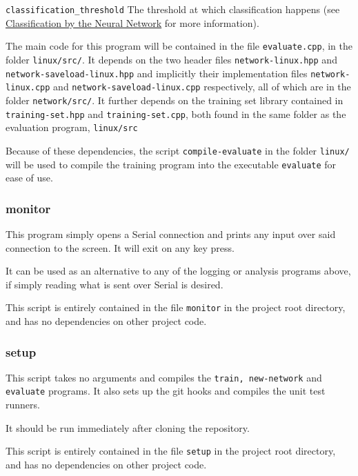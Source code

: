 \documentclass[a4paper]{article}
\begin{document}
\lstinline{classification_threshold} The threshold at which classification happens (see \hyperref[subsec:dc_classification]{Classification by the Neural Network} for more information).

The main code for this program will be contained in the file \lstinline{evaluate.cpp}, in the folder \lstinline{linux/src/}. It depends on the two header files \lstinline{network-linux.hpp} and \lstinline{network-saveload-linux.hpp} and implicitly their implementation files \lstinline{network-linux.cpp} and \lstinline{network-saveload-linux.cpp} respectively, all of which are in the folder \lstinline{network/src/}. It further depends on the training set library contained in \lstinline{training-set.hpp} and \lstinline{training-set.cpp}, both found in the same folder as the evaluation program, \lstinline{linux/src}

Because of these dependencies, the script \lstinline{compile-evaluate} in the folder \lstinline{linux/} will be used to compile the training program into the executable \lstinline{evaluate} for ease of use.

\subsubsection{monitor}
\label{subsubsec:dc_csa_monitor}

This program simply opens a Serial connection and prints any input over said connection to the screen. It will exit on any key press.

It can be used as an alternative to any of the logging or analysis programs above, if simply reading what is sent over Serial is desired.

This script is entirely contained in the file \lstinline{monitor} in the project root directory, and has no dependencies on other project code.

\subsubsection{setup}

This script takes no arguments and compiles the \lstinline{train, new-network} and \lstinline{evaluate} programs. It also sets up the git hooks and compiles the unit test runners.

It should be run immediately after cloning the repository.

This script is entirely contained in the file \lstinline{setup} in the project root directory, and has no dependencies on other project code.
\end{document}
